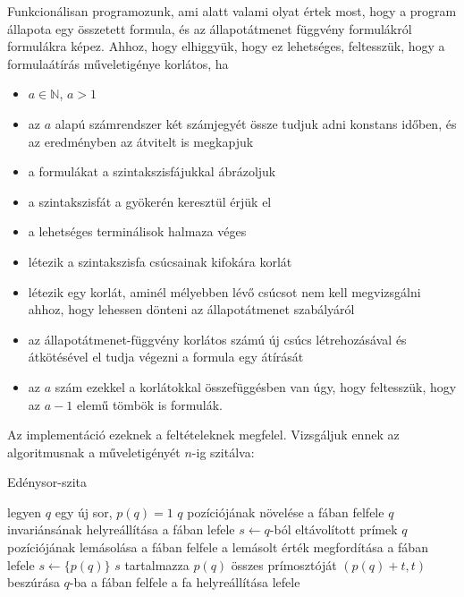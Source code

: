 \documentclass{article}
\begin{document}
Funkcionálisan programozunk, ami alatt valami olyat értek most, hogy a program állapota egy összetett formula, és az állapotátmenet függvény formulákról formulákra képez. Ahhoz, hogy elhiggyük, hogy ez lehetséges, feltesszük, hogy a formulaátírás műveletigénye korlátos, ha
\begin{itemize}
\item $a \in \mathbb{N}$, $a>1$
\item az $a$ alapú számrendszer két számjegyét össze tudjuk adni konstans időben, és az eredményben az átvitelt is megkapjuk
\item a formulákat a szintakszisfájukkal ábrázoljuk
\item a szintakszisfát a gyökerén keresztül érjük el
\item a lehetséges terminálisok halmaza véges
\item létezik a szintakszisfa csúcsainak kifokára korlát
\item létezik egy korlát, aminél mélyebben lévő csúcsot nem kell megvizsgálni ahhoz, hogy lehessen dönteni az állapotátmenet szabályáról
\item az állapotátmenet-függvény korlátos  számú új csúcs létrehozásával és átkötésével el tudja végezni a formula egy átírását
\item az $a$ szám ezekkel a korlátokkal összefüggésben van úgy, hogy feltesszük, hogy az $a-1$ elemű tömbök is formulák.
\end{itemize}

Az implementáció ezeknek a feltételeknek megfelel. Vizsgáljuk ennek az algoritmusnak a műveletigényét $n$-ig szitálva:
\begin{algorithm}[H]
\caption{Edénysor-szita}
\begin{algorithmic}[1]
\State legyen $q$ egy új sor, $p(q)=1$
\State $q$ pozíciójának növelése a fában felfele
\State $q$ invariánsának helyreállítása a fában lefele
\State $s \gets q$-ból eltávolított prímek
	\State $q$ pozíciójának lemásolása a fában felfele
	\State a lemásolt érték megfordítása a fában lefele
	\State $s \gets \{ p(q) \}$
\EndIf
\State $s$ tartalmazza $p(q)$ összes prímosztóját
	\State $(p(q)+t, t)$ beszúrása $q$-ba a fában felfele
	\State a fa helyreállítása lefele
\EndFor
\EndWhile
\end{algorithmic}
\end{algorithm}
\end{document}
